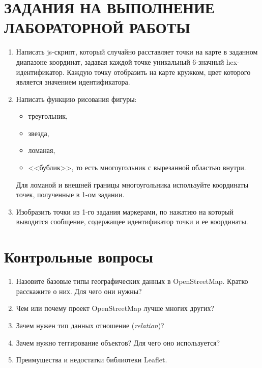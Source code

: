 \newpage

\chapter{ЗАДАНИЯ НА ВЫПОЛНЕНИЕ ЛАБОРАТОРНОЙ РАБОТЫ}
\begin{enumerate}
    \item Написать js-скрипт, который случайно расставляет точки на карте 
        в заданном диапазоне координат, задавая каждой точке уникальный 
        6-значный hex-идентификатор. Каждую точку отобразить на карте 
        кружком, цвет которого является значением идентификатора.
    \item Написать функцию рисования фигуры:
    \begin{itemize}
        \item треугольник,
        \item звезда,
        \item ломаная,
        \item <<бублик>>, то есть многоугольник с вырезанной областью внутри.
    \end{itemize}
    Для ломаной и внешней границы многоугольника используйте координаты точек,
    полученные в 1-ом задании.
    \item Изобразить точки из 1-го задания маркерами, по нажатию на который 
        выводится сообщение, содержащее идентификатор точки и ее координаты.
\end{enumerate}

\newpage

\chapter{Контрольные вопросы}
\begin{enumerate}
    \item Назовите базовые типы географических данных в OpenStreetMap. 
        Кратко расскажите о них. Для чего они нужны?
    \item Чем или почему проект OpenStreetMap лучше многих других?
    \item Зачем нужен тип данных отношение (\emph{relation})?
    \item Зачем нужно теггирование объектов? Для чего оно используется?
    \item Преимущества и недостатки библиотеки Leaflet.
\end{enumerate}

\newpage

